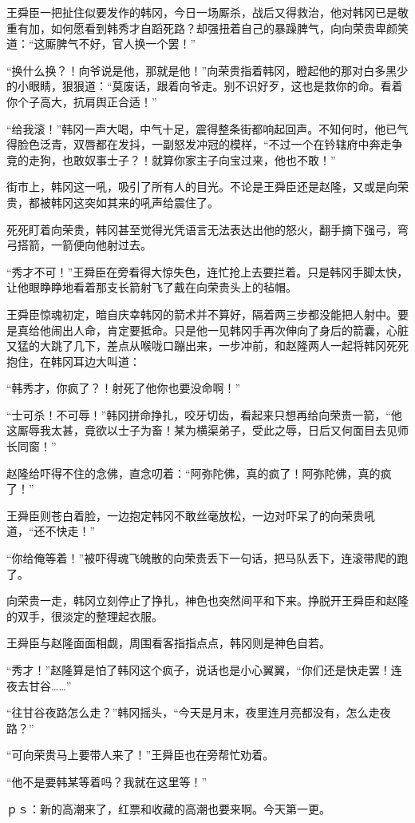 王舜臣一把扯住似要发作的韩冈，今日一场厮杀，战后又得救治，他对韩冈已是敬重有加，如何愿看到韩秀才自蹈死路？却强扭着自己的暴躁脾气，向向荣贵卑颜笑道：“这厮脾气不好，官人换一个罢！”

“换什么换？！向爷说是他，那就是他！”向荣贵指着韩冈，瞪起他的那对白多黑少的小眼睛，狠狠道：“莫废话，跟着向爷走。别不识好歹，这也是救你的命。看着你个子高大，抗肩舆正合适！”

“给我滚！”韩冈一声大喝，中气十足，震得整条街都响起回声。不知何时，他已气得脸色泛青，双唇都在发抖，一副怒发冲冠的模样，“不过一个在钤辖府中奔走争竞的走狗，也敢奴事士子？！就算你家主子向宝过来，他也不敢！”

街市上，韩冈这一吼，吸引了所有人的目光。不论是王舜臣还是赵隆，又或是向荣贵，都被韩冈这突如其来的吼声给震住了。

死死盯着向荣贵，韩冈甚至觉得光凭语言无法表达出他的怒火，翻手摘下强弓，弯弓搭箭，一箭便向他射过去。

“秀才不可！”王舜臣在旁看得大惊失色，连忙抢上去要拦着。只是韩冈手脚太快，让他眼睁睁地看着那支长箭射飞了戴在向荣贵头上的毡帽。

王舜臣惊魂初定，暗自庆幸韩冈的箭术并不算好，隔着两三步都没能把人射中。要是真给他闹出人命，肯定要抵命。只是他一见韩冈手再次伸向了身后的箭囊，心脏又猛的大跳了几下，差点从喉咙口蹦出来，一步冲前，和赵隆两人一起将韩冈死死抱住，在韩冈耳边大叫道：

“韩秀才，你疯了？！射死了他你也要没命啊！”

“士可杀！不可辱！”韩冈拼命挣扎，咬牙切齿，看起来只想再给向荣贵一箭，“他这厮辱我太甚，竟欲以士子为畜！某为横渠弟子，受此之辱，日后又何面目去见师长同窗！”

赵隆给吓得不住的念佛，直念叨着：“阿弥陀佛，真的疯了！阿弥陀佛，真的疯了！”

王舜臣则苍白着脸，一边抱定韩冈不敢丝毫放松，一边对吓呆了的向荣贵吼道，“还不快走！”

“你给俺等着！”被吓得魂飞魄散的向荣贵丢下一句话，把马队丢下，连滚带爬的跑了。

向荣贵一走，韩冈立刻停止了挣扎，神色也突然间平和下来。挣脱开王舜臣和赵隆的双手，很淡定的整理起衣服。

王舜臣与赵隆面面相觑，周围看客指指点点，韩冈则是神色自若。

“秀才！”赵隆算是怕了韩冈这个疯子，说话也是小心翼翼，“你们还是快走罢！连夜去甘谷……”

“往甘谷夜路怎么走？”韩冈摇头，“今天是月末，夜里连月亮都没有，怎么走夜路？”

“可向荣贵马上要带人来了！”王舜臣也在旁帮忙劝着。

“他不是要韩某等着吗？我就在这里等！”

ｐｓ：新的高潮来了，红票和收藏的高潮也要来啊。今天第一更。

